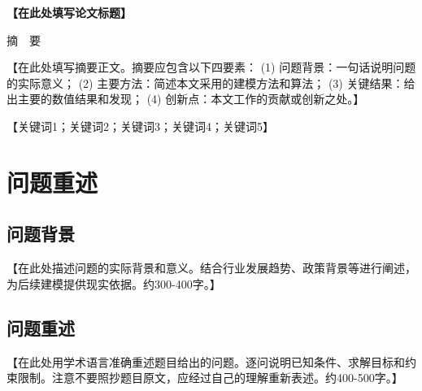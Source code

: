 \documentclass[12pt,letterpaper]{ctexart}
\numberwithin{equation}{section}
\numberwithin{figure}{section}
\numberwithin{table}{section}
\begin{document}

\begin{center}
{\heiti{}\textbf{【在此处填写论文标题】}}

\vspace{1cm}

{\heiti{}摘\ \ 要}
\end{center}

\vspace{0.5cm}

{
\songti{}
【在此处填写摘要正文。摘要应包含以下四要素：
(1) 问题背景：一句话说明问题的实际意义；
(2) 主要方法：简述本文采用的建模方法和算法；
(3) 关键结果：给出主要的数值结果和发现；
(4) 创新点：本文工作的贡献或创新之处。】

\vspace{1cm}

【关键词1；关键词2；关键词3；关键词4；关键词5】
}

\newpage

{
\pagestyle{empty}
\tableofcontents
}
\newpage

\setcounter{page}{1}
\pagestyle{fancy}

\section{问题重述}

\subsection{问题背景}
【在此处描述问题的实际背景和意义。结合行业发展趋势、政策背景等进行阐述，为后续建模提供现实依据。约300-400字。】

\subsection{问题重述}
【在此处用学术语言准确重述题目给出的问题。逐问说明已知条件、求解目标和约束限制。注意不要照抄题目原文，应经过自己的理解重新表述。约400-500字。】
\end{document}
